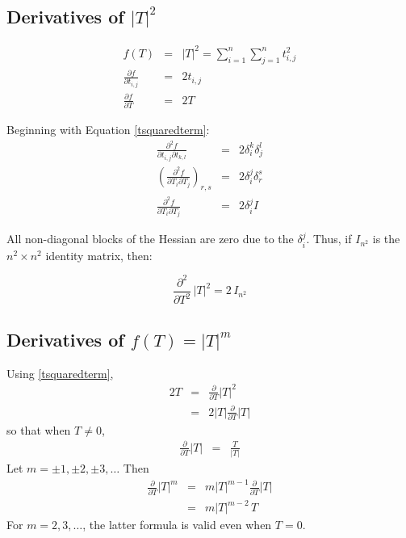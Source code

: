 \documentclass{report}
\begin{document}
\subsection{Derivatives of $|T|^2$ \label{tsquared}}

\begin{eqnarray}
f(T) &=& |T|^2 = \sum_{i=1}^n \sum_{j=1}^n t_{i,j}^2 \\
\label{tsquaredterm}
\frac{\partial f}{\partial t_{i,j}} &=& 2 t_{i,j} \\
\frac{\partial f}{\partial T} &=& 2 T
\end{eqnarray}

\noindent Beginning with Equation \ref{tsquaredterm}:
\begin{eqnarray}
\frac{\partial^2 f}{\partial t_{i,j} \partial t_{k,l}} &=& 2 \delta_i^k \delta_j^l \\
\left(\frac{\partial^2 f}{\partial T_i \partial T_j}\right)_{r,s} &=& 2 \delta_i^j \delta_r^s \\
\frac{\partial^2 f}{\partial T_i \partial T_j} &=& 2 \delta_i^j I
\end{eqnarray}

\noindent All non-diagonal blocks of the Hessian are zero due to the $\delta_i^j$.  Thus, if $I_{n^2}$ is the $n^2 \times n^2$ identity matrix, then:

\begin{equation}
\frac{\partial^2}{\partial T^2} \, |T|^2 = 2 \, I_{n^2}
\end{equation}

\subsection{Derivatives of $f(T)=|T|^m$}
Using \ref{tsquaredterm},
\begin{eqnarray}
2 T & = & \frac{\partial}{\partial T} |T|^2 \nonumber \\
 & = & 2 |T| \frac{\partial}{\partial T} |T| \nonumber
\end{eqnarray}
so that when $T \neq 0$,
\begin{eqnarray}
\frac{\partial}{\partial T} |T| & = & \frac{T}{|T|}
\end{eqnarray}
Let $m=\pm 1, \pm 2,\pm 3,\ldots$  Then
\begin{eqnarray}
\frac{\partial}{\partial T} |T|^m & = & m |T|^{m-1} \frac{\partial }{\partial T}|T| \\
 & = & m |T|^{m-2} \, T \label{firstdervoftm}
\end{eqnarray}
For $m=2,3,\ldots$, the latter formula is valid even when $T=0$. \newline
\end{document}
